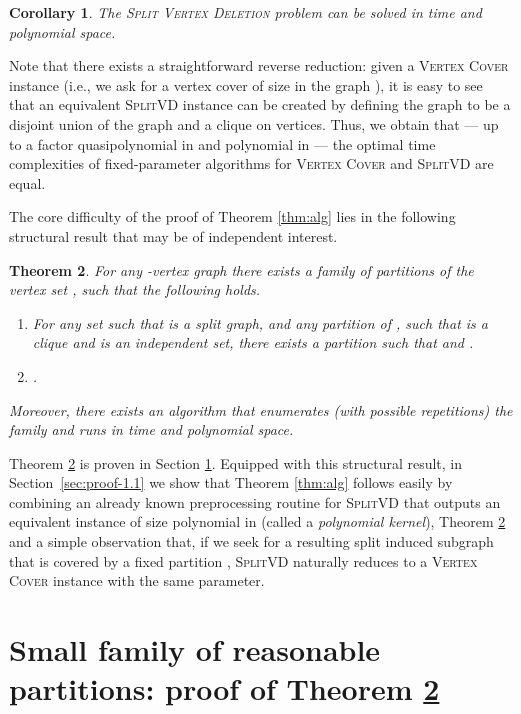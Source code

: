 \documentclass{article}
\newcommand{\splitlong}{\textsc{Split Vertex Deletion}\xspace}
\newcommand{\splitvd}{\textsc{SplitVD}\xspace}
\newcommand{\vertexcover}{\textsc{Vertex Cover}\xspace}
\newtheorem{theorem}{Theorem}[section]
\newtheorem{corollary}[theorem]{Corollary}
\theoremstyle{definition}
\begin{document}
\begin{corollary}
The \splitlong problem can be solved in 
\linebreak 
 time and polynomial space.
\end{corollary}

Note that there exists a straightforward reverse reduction:
given a \vertexcover instance  (i.e., we ask for a vertex cover of size 
in the graph ), it is easy to see that an equivalent
\splitvd instance  can be created by defining the graph  to be
a disjoint union of the graph  and a clique on  vertices.
Thus, we obtain that --- up to a factor quasipolynomial in  and polynomial in  ---
the optimal
time complexities of fixed-parameter algorithms for \vertexcover and \splitvd are equal.

The core difficulty of the proof of Theorem \ref{thm:alg} lies in the following
structural result that may be of independent interest.
\begin{theorem}\label{thm:parts}
For any -vertex graph  there exists a family 
of partitions  of the vertex set , such that
the following holds.
\begin{enumerate}
\item For any set  such that  is a split graph,
  and any partition  of , such that  is a clique
  and  is an independent set, there exists
  a partition  such that
   and .
\item .
\end{enumerate}
Moreover, there exists an algorithm that enumerates (with possible repetitions) the family 
and runs in time  and polynomial space.
\end{theorem}

Theorem \ref{thm:parts} is proven in Section \ref{sec:parts}.
Equipped with this structural result, in Section~\ref{sec:proof-1.1} we
show that Theorem \ref{thm:alg} follows
easily by combining an already known preprocessing routine for \splitvd that
outputs an equivalent instance of size polynomial in  (called a {\em{polynomial kernel}}),
Theorem \ref{thm:parts} and a simple observation that, if we seek for a resulting
split induced subgraph that is covered by a fixed
partition , \splitvd naturally reduces to a \vertexcover
instance with the same parameter.

\section{Small family of reasonable partitions: proof of Theorem \ref{thm:parts}}\label{sec:parts}
\newcommand{\stan}{\ensuremath{\mathcal{S}}}
\end{document}

